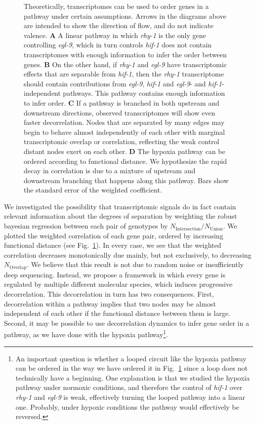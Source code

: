 \documentclass[9pt,twocolumn,twoside]{pnas-new}
\newcommand{\gene}[1]{\emph{#1}}
\begin{document}
\begin{figure}[tbhp]
\caption{
Theoretically, transcriptomes can be used to order genes in a pathway under
certain assumptions. Arrows in the diagrams above are intended to show the
direction of flow, and do not indicate valence.
\textbf{A} A linear pathway in which \gene{rhy-1} is the only gene controlling
\gene{egl-9},
which in turn controls \gene{hif-1} does not contain transcriptomes with enough
information to infer the order between genes.
\textbf{B} On the other hand, if \gene{rhy-1} and \gene{egl-9} have transcriptomic
effects that are separable from \gene{hif-1}, then the \gene{rhy-1} transcriptome
should contain contributions from \gene{egl-9}, \gene{hif-1} and \gene{egl-9}- and
\gene{hif-1}-independent pathways. This pathway contains enough information to
infer order.
\textbf{C} If a pathway is branched in both upstream and downstream directions,
observed transcriptomes will show even faster decorrelation. Nodes that are
separated by many edges may begin to behave almost independently of each other
with marginal transcriptomic overlap or correlation, reflecting the weak control
distant nodes exert on each other.
\textbf{D} The hypoxia pathway can be ordered according to functional distance.
We hypothesize the rapid decay in correlation is due to a mixture of
upstream and downstream branching that happens along this pathway. Bars show the
standard error of the weighted coefficient.
}
\label{fig:decorrelation}
\end{figure}

We investigated the possibility that transcriptomic signals do in fact contain
relevant information about the degrees of separation by weighting the robust
bayesian regression between each pair of genotypes by
$N_\mathrm{Intersection}/N_{\mathrm{Union}}$. We plotted the weighted
correlation of each gene pair, ordered by increasing functional distance
(see Fig.~\ref{fig:decorrelation}). In every case, we see that the weighted
correlation decreases monotonically due mainly, but not exclusively, to
decreasing $N_\mathrm{Overlap}$.
We believe that this result is not due to random noise or insufficiently deep
sequencing. Instead, we propose a framework in which every gene is regulated
by multiple different molecular species, which induces progressive decorrelation.
This decorrelation in turn has two consequences. First, decorrelation within a
pathway implies that two nodes may be almost independent of each other if the
functional distance between them is large. Second, it may be possible to use
decorrelation dynamics to infer gene order in a pathway, as we have done with
the hypoxia
pathway\footnote{
An important question is whether a looped circuit
like the hypoxia pathway can be ordered in the way we have ordered it in
Fig.~\ref{fig:decorrelation} since a loop does not technically have a beginning.
One explanation is that we studied the hypoxia pathway under normoxic conditions,
and therefore the control of \gene{hif-1} over \gene{rhy-1} and \gene{egl-9} is
weak, effectively turning the looped pathway into a linear one. Probably, under
hypoxic conditions the pathway would effectively be reversed.
}.
\end{document}

